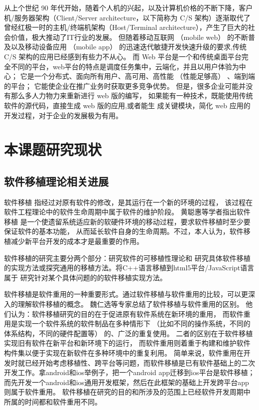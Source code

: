 从上个世纪 90 年代开始，随着个人机的兴起，以及计算机价格的不断下降，客户机/服务器架构（Client/Server architecture，以下简称为 C/S 架构）逐渐取代了
曾经红极一时的主机/终端机架构（Host/Terminal architecture），产生了巨大的社会价值，极大推动了IT行业的发展。
但随着移动互联网 （mobile web） 的不断普及以及移动设备应用 （mobile app） 的迅速迭代敏捷开发快速升级的要求,传统 C/S 架构的应用已经感到有些力不从心。
而 Web 平台是一个和传统桌面平台完全不同的平台，web平台的特点是调度任务集中，云端化，并且以用户体验为中心；
它是一个分布式、面向所有用户、高可用、高性能 （性能足够高） 、端到端的平台；
它能使企业在推广业务时获取更多竞争优势。
但是，很多企业可能并没有那么多人力物力来重新进行 web 版的编写，
如果能有一种技术，既能使用传统软件的源代码，直接生成 web 版的应用,或者能生 
成关键模块，简化 web 应用的开发过程，对于企业的发展极为有用。

\section{本课题研究现状}

\subsection{软件移植理论相关进展}

软件移植
指经过对原有软件的修改，是其运行在一个新的环境的过程，
该过程在软件工程理论中的软件生命周期中属于软件的维护阶段。
黄聪惠等学者指出软件移植
是一个使遗留系统适应新的软硬件环境的移动过程，要求软件移植时至少要保证软件的基本功能，
从而延长软件自身的生命周期。不过，本人认为，软件移植减少新平台开发的成本才是最重要的作用。

软件移植的研究主要分两个部分：研究软件的可移植性理论和
研究具体软件移植的实现方法或探究通用的移植方法。将C++语言移植到html5平台/JavaScript语言属于
研究针对某个具体问题的的软件移植实现方法。

软件移植是软件重用的一种重要形式。通过软件移植与软件重用的比较，可以更深入的理解软件移植的概念。
魏仁选等专家总结了软件移植与软件重用的区别。
他们认为：软件移植研究的目的在于促进原有软件系统在新环境的重用，
而软件重用是实现一个软件系统的软件制品在多种情形下 （比如不同的操作系统，不同的体系结构，不同的硬件配置等） 的、广泛的重复使用。
二者的区别在于软件移植实现旧有软件在新平台和新环境下的运行，
而软件重用则着重于构建和维护软件构件集以便于实现在新软件在多种环境中的重复利用。
简单来说，软件重用在开发时就已经开始考虑移植性、跨平台等问题，而软件移植是已有软件基础上的二次开发工作。拿android和ios举例子，把一个android app迁移到ios平台是软件移植；而先开发一个android和ios通用开发框架，然后在此框架的基础上开发跨平台app则属于软件重用。
软件移植在研究的目的和所涉及的范围上已经软件开发周期中所属的时间都和软件重用不同。

